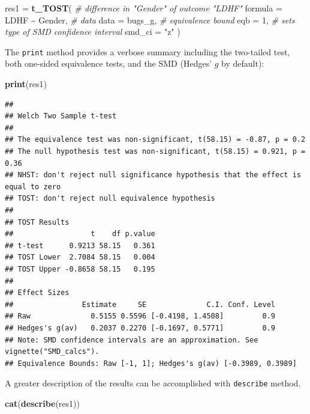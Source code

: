 \documentclass[]{interact}
\theoremstyle{plain}%
\theoremstyle{definition}
\theoremstyle{remark}
\newenvironment{Shaded}{\begin{snugshade}}{\end{snugshade}}
\newcommand{\AttributeTok}[1]{\textcolor[rgb]{0.13,0.29,0.53}{#1}}
\newcommand{\CommentTok}[1]{\textcolor[rgb]{0.56,0.35,0.01}{\textit{#1}}}
\newcommand{\DecValTok}[1]{\textcolor[rgb]{0.00,0.00,0.81}{#1}}
\newcommand{\FunctionTok}[1]{\textcolor[rgb]{0.13,0.29,0.53}{\textbf{#1}}}
\newcommand{\NormalTok}[1]{#1}
\newcommand{\OtherTok}[1]{\textcolor[rgb]{0.56,0.35,0.01}{#1}}
\newcommand{\SpecialCharTok}[1]{\textcolor[rgb]{0.81,0.36,0.00}{\textbf{#1}}}
\newcommand{\StringTok}[1]{\textcolor[rgb]{0.31,0.60,0.02}{#1}}
\begin{document}
\begin{Shaded}
\begin{Highlighting}[]
\NormalTok{res1 }\OtherTok{=} \FunctionTok{t\_TOST}\NormalTok{(}
  \CommentTok{\# difference in "Gender" of outcome "LDHF"}
  \AttributeTok{formula =}\NormalTok{ LDHF }\SpecialCharTok{\textasciitilde{}}\NormalTok{ Gender,}
  \CommentTok{\# data}
  \AttributeTok{data =}\NormalTok{ bugs\_g,}
  \CommentTok{\# equivalence bound}
  \AttributeTok{eqb =} \DecValTok{1}\NormalTok{,}
  \CommentTok{\# sets type of SMD confidence interval}
  \AttributeTok{smd\_ci =} \StringTok{"z"}
\NormalTok{)}
\end{Highlighting}
\end{Shaded}

The \texttt{print} method provides a verbose summary including the
two-tailed test, both one-sided equivalence tests, and the SMD (Hedges'
\(g\) by default):

\begin{Shaded}
\begin{Highlighting}[]
\FunctionTok{print}\NormalTok{(res1)}
\end{Highlighting}
\end{Shaded}

\begin{verbatim}
## 
## Welch Two Sample t-test
## 
## The equivalence test was non-significant, t(58.15) = -0.87, p = 0.2
## The null hypothesis test was non-significant, t(58.15) = 0.921, p = 0.36
## NHST: don't reject null significance hypothesis that the effect is equal to zero 
## TOST: don't reject null equivalence hypothesis
## 
## TOST Results 
##                  t    df p.value
## t-test      0.9213 58.15   0.361
## TOST Lower  2.7084 58.15   0.004
## TOST Upper -0.8658 58.15   0.195
## 
## Effect Sizes 
##                Estimate     SE              C.I. Conf. Level
## Raw              0.5155 0.5596 [-0.4198, 1.4508]         0.9
## Hedges's g(av)   0.2037 0.2270 [-0.1697, 0.5771]         0.9
## Note: SMD confidence intervals are an approximation. See vignette("SMD_calcs").
## Equivalence Bounds: Raw [-1, 1]; Hedges's g(av) [-0.3989, 0.3989]
\end{verbatim}

A greater description of the results can be accomplished with
\texttt{describe} method.

\begin{Shaded}
\begin{Highlighting}[]
\FunctionTok{cat}\NormalTok{(}\FunctionTok{describe}\NormalTok{(res1))}
\end{Highlighting}
\end{Shaded}
\end{document}
